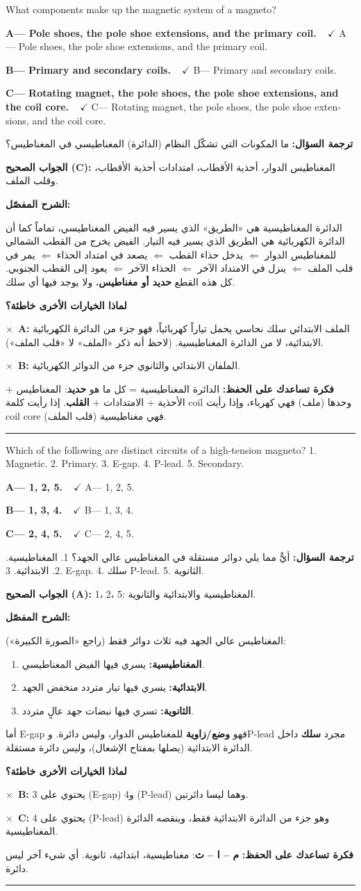 \documentclass[11pt,a4paper]{article}
\newcommand{\en}[1]{\textenglish{#1}}
\newcommand{\correctletter}{}
\newcommand{\opt}[2]{%
  \ifdefstring{\correctletter}{#1}%
    {\textcolor{ansgreen}{\textbf{#1— #2\ \ $\checkmark$}}}%
    {#1— #2}\par}
\newcommand{\Q}[6]{%
  \renewcommand{\correctletter}{#6}%
  \par\bigskip
  \phantomsection\label{q#1}%
  \begin{tcolorbox}[enhanced,breakable,colback=qback,colframe=qframe,
      arc=2mm,boxrule=0.8pt,fonttitle=\bfseries,
      title={\en{Question #1}}]
    \begin{english}
      #2\par\smallskip
      \opt{A}{#3}\opt{B}{#4}\opt{C}{#5}
    \end{english}
  \end{tcolorbox}}
\newcommand{\tr}[1]{\textbf{\textcolor{qframe}{ترجمة السؤال:}} #1\par}
\newcommand{\ans}[2]{%
  \begin{tcolorbox}[colback=ansback,colframe=ansgreen,boxrule=0.6pt,arc=1.5mm,
      left=4pt,right=4pt,top=2pt,bottom=2pt]
    \textbf{\textcolor{ansgreen}{الجواب الصحيح (\en{#1}):}} #2
  \end{tcolorbox}}
\newcommand{\sharh}[1]{\textbf{\textcolor{conceptc}{الشرح المفصّل:}}\par #1\par}
\newcommand{\nohead}{\textbf{\textcolor{wrongc}{لماذا الخيارات الأخرى خاطئة؟}}\par}
\newcommand{\no}[2]{\hspace*{1em}\textcolor{wrongc}{$\times$}\ \textbf{\en{#1}:} #2\par}
\newcommand{\tip}[1]{%
  \begin{tcolorbox}[colback=tipback,colframe=tipframe,boxrule=0.5pt,arc=1.5mm,
      left=4pt,right=4pt,top=2pt,bottom=2pt]
    \textbf{فكرة تساعدك على الحفظ:} #1
  \end{tcolorbox}}
\newcommand{\qsep}{\par\medskip\noindent\textcolor{qframe!40}{\rule{\linewidth}{0.4pt}}\par}
\begin{document}
\Q{8519}{What components make up the magnetic system of a magneto?}
{Pole shoes, the pole shoe extensions, and the primary coil.}
{Primary and secondary coils.}
{Rotating magnet, the pole shoes, the pole shoe extensions, and the coil core.}{C}
\tr{ما المكونات التي تشكّل النظام (الدائرة) المغناطيسي في المغناطيس؟}
\ans{C}{المغناطيس الدوار، أحذية الأقطاب، امتدادات أحذية الأقطاب، وقلب الملف.}
\sharh{الدائرة المغناطيسية هي «الطريق» الذي يسير فيه الفيض المغناطيسي، تماماً كما أن الدائرة الكهربائية هي الطريق الذي يسير فيه التيار. الفيض يخرج من القطب الشمالي للمغناطيس الدوار $\Leftarrow$ يدخل حذاء القطب $\Leftarrow$ يصعد في امتداد الحذاء $\Leftarrow$ يمر في قلب الملف $\Leftarrow$ ينزل في الامتداد الآخر $\Leftarrow$ الحذاء الآخر $\Leftarrow$ يعود إلى القطب الجنوبي. كل هذه القطع \textbf{حديد أو مغناطيس}، ولا يوجد فيها أي سلك.}
\nohead
\no{A}{الملف الابتدائي سلك نحاسي يحمل تياراً كهربائياً، فهو جزء من الدائرة الكهربائية الابتدائية، لا من الدائرة المغناطيسية. (لاحظ أنه ذكر «الملف» لا «قلب الملف»).}
\no{B}{الملفان الابتدائي والثانوي جزء من الدوائر الكهربائية.}
\tip{الدائرة المغناطيسية = كل ما هو \textbf{حديد}: المغناطيس + الأحذية + الامتدادات + \textbf{القلب}. إذا رأيت كلمة \en{coil} وحدها (ملف) فهي كهرباء، وإذا رأيت \en{coil core} (قلب الملف) فهي مغناطيسية.}
\qsep

\Q{8602}{Which of the following are distinct circuits of a high-tension magneto? 1. Magnetic. 2. Primary. 3. E-gap. 4. P-lead. 5. Secondary.}
{1, 2, 5.}
{1, 3, 4.}
{2, 4, 5.}{A}
\tr{أيٌّ مما يلي دوائر مستقلة في المغناطيس عالي الجهد؟ 1. المغناطيسية. 2. الابتدائية. 3. \en{E-gap}. 4. سلك \en{P-lead}. 5. الثانوية.}
\ans{A}{1، 2، 5: المغناطيسية والابتدائية والثانوية.}
\sharh{المغناطيس عالي الجهد فيه ثلاث دوائر فقط (راجع «الصورة الكبيرة»):
\begin{enumerate}[label=\arabic*.]
  \item \textbf{المغناطيسية:} يسري فيها الفيض المغناطيسي.
  \item \textbf{الابتدائية:} يسري فيها تيار متردد منخفض الجهد.
  \item \textbf{الثانوية:} تسري فيها نبضات جهد عالٍ متردد.
\end{enumerate}
أما \en{E-gap} فهو \textbf{وضع/زاوية} للمغناطيس الدوار، وليس دائرة. و\en{P-lead} مجرد \textbf{سلك} داخل الدائرة الابتدائية (يصلها بمفتاح الإشعال)، وليس دائرة مستقلة.}
\nohead
\no{B}{يحتوي على 3 (\en{E-gap}) و4 (\en{P-lead}) وهما ليسا دائرتين.}
\no{C}{يحتوي على 4 (\en{P-lead}) وهو جزء من الدائرة الابتدائية فقط، وينقصه الدائرة المغناطيسية.}
\tip{\textbf{م – ا – ث}: مغناطيسية، ابتدائية، ثانوية. أي شيء آخر ليس دائرة.}
\qsep
\end{document}
